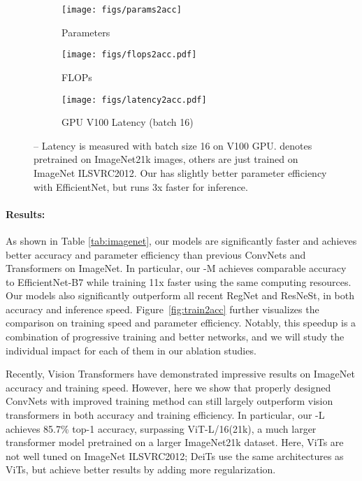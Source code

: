 \documentclass{article}
\begin{document}
\begin{figure*}
    \centering
    \begin{subfigure}[t]{0.33\textwidth}
        \centering
        \texttt{[image: figs/params2acc]}
        \caption{Parameters}
    \end{subfigure}
    \begin{subfigure}[t]{0.33\textwidth}
        \centering
		\texttt{[image: figs/flops2acc.pdf]}
		\caption{FLOPs}
    \end{subfigure}
    \begin{subfigure}[t]{0.33\textwidth}
		\centering
		\texttt{[image: figs/latency2acc.pdf]}
		\caption{GPU V100 Latency (batch 16)}
	\end{subfigure}
	\vskip -0.1in
    \caption{
    	  -- Latency is measured with batch size 16 on V100 GPU.  denotes pretrained on ImageNet21k images, others are just trained on ImageNet ILSVRC2012. Our {\xnet} has slightly better parameter efficiency with EfficientNet, but runs 3x faster for inference.
    }
     \label{fig:infer2acc}
\end{figure*}
 
\paragraph{Results:}
As shown in Table \ref{tab:imagenet}, our {\xnet} models are significantly faster and achieves better accuracy and parameter efficiency than previous ConvNets and Transformers on ImageNet. In particular, our {\xnet}-M achieves comparable accuracy to EfficientNet-B7 while training 11x faster using the same computing resources. Our {\xnet} models also significantly outperform all recent RegNet and ResNeSt, in both accuracy and inference speed. Figure~\ref{fig:train2acc} further visualizes the comparison on training speed and parameter efficiency. Notably, this speedup is a combination of progressive training and better networks, and we will study the individual impact for each of them in our ablation studies.


Recently, Vision Transformers have demonstrated impressive results on ImageNet accuracy and training speed. However, here we show that properly designed ConvNets with improved training method can still largely outperform vision transformers in both accuracy and training efficiency. In particular, our {\xnet}-L achieves 85.7\% top-1 accuracy, surpassing ViT-L/16(21k), a much larger transformer model pretrained on a larger ImageNet21k dataset. Here, ViTs are not well tuned on ImageNet ILSVRC2012; DeiTs use the same architectures as ViTs, but achieve better results by adding more regularization.
\end{document}
